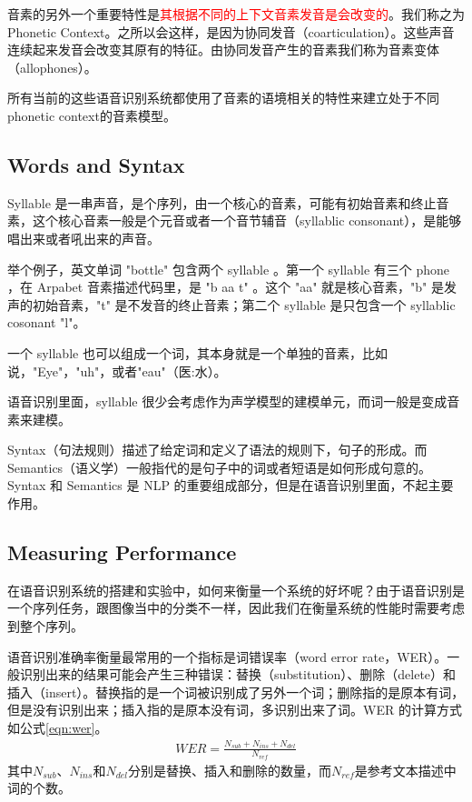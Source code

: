音素的另外一个重要特性是\textcolor{red}{其根据不同的上下文音素发音是会改变的}。我们称之为Phonetic Context。之所以会这样，是因为协同发音（coarticulation）。这些声音连续起来发音会改变其原有的特征。由协同发音产生的音素我们称为音素变体（allophones）。

所有当前的这些语音识别系统都使用了音素的语境相关的特性来建立处于不同phonetic context的音素模型。

\subsection{Words and Syntax} %
\label{sub:words_and_syntax}
Syllable 是一串声音，是个序列，由一个核心的音素，可能有初始音素和终止音素，这个核心音素一般是个元音或者一个音节辅音（syllablic consonant），是能够唱出来或者吼出来的声音。

举个例子，英文单词 "bottle" 包含两个 syllable 。第一个 syllable 有三个 phone ，在 Arpabet 音素描述代码里，是 "b aa t" 。这个 "aa" 就是核心音素，"b" 是发声的初始音素，"t" 是不发音的终止音素；第二个 syllable 是只包含一个 syllablic cosonant "l"。

一个 syllable 也可以组成一个词，其本身就是一个单独的音素，比如说，"Eye"，"uh"，或者"eau"（医:水）。

语音识别里面，syllable 很少会考虑作为声学模型的建模单元，而词一般是变成音素来建模。

Syntax（句法规则）描述了给定词和定义了语法的规则下，句子的形成。而 Semantics（语义学）一般指代的是句子中的词或者短语是如何形成句意的。Syntax 和 Semantics 是 NLP 的重要组成部分，但是在语音识别里面，不起主要作用。

\subsection{Measuring Performance} %
\label{sub:measuring_performance}
在语音识别系统的搭建和实验中，如何来衡量一个系统的好坏呢？由于语音识别是一个序列任务，跟图像当中的分类不一样，因此我们在衡量系统的性能时需要考虑到整个序列。

语音识别准确率衡量最常用的一个指标是词错误率（word error rate，WER）。一般识别出来的结果可能会产生三种错误：替换（substitution）、删除（delete）和插入（insert）。替换指的是一个词被识别成了另外一个词；删除指的是原本有词，但是没有识别出来；插入指的是原本没有词，多识别出来了词。WER 的计算方式如公式\ref{eqn:wer}。
\begin{align}
\label{eqn:wer}
  WER = \frac{N_{sub}+N_{ins}+N_{del}}{N_{ref}}
\end{align}
其中$N_{sub}$、$N_{ins}$和$N_{del}$分别是替换、插入和删除的数量，而$N_{ref}$是参考文本描述中词的个数。

